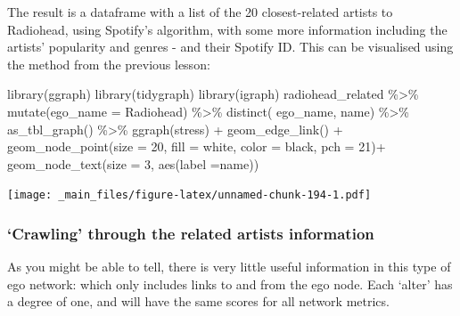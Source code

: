 \documentclass[
]{book}
\newenvironment{Shaded}{\begin{snugshade}}{\end{snugshade}}
\newcommand{\AttributeTok}[1]{\textcolor[rgb]{0.77,0.63,0.00}{#1}}
\newcommand{\DecValTok}[1]{\textcolor[rgb]{0.00,0.00,0.81}{#1}}
\newcommand{\FunctionTok}[1]{\textcolor[rgb]{0.00,0.00,0.00}{#1}}
\newcommand{\NormalTok}[1]{#1}
\newcommand{\SpecialCharTok}[1]{\textcolor[rgb]{0.00,0.00,0.00}{#1}}
\newcommand{\StringTok}[1]{\textcolor[rgb]{0.31,0.60,0.02}{#1}}
\begin{document}
The result is a dataframe with a list of the 20 closest-related artists to Radiohead, using Spotify's algorithm, with some more information including the artists' popularity and genres - and their Spotify ID. This can be visualised using the method from the previous lesson:

\begin{Shaded}
\begin{Highlighting}[]
\FunctionTok{library}\NormalTok{(ggraph)}
\FunctionTok{library}\NormalTok{(tidygraph)}
\FunctionTok{library}\NormalTok{(igraph)}
\NormalTok{radiohead\_related }\SpecialCharTok{\%\textgreater{}\%} 
  \FunctionTok{mutate}\NormalTok{(}\AttributeTok{ego\_name =} \StringTok{\textquotesingle{}Radiohead\textquotesingle{}}\NormalTok{) }\SpecialCharTok{\%\textgreater{}\%} 
  \FunctionTok{distinct}\NormalTok{( ego\_name, name) }\SpecialCharTok{\%\textgreater{}\%} 
  \FunctionTok{as\_tbl\_graph}\NormalTok{() }\SpecialCharTok{\%\textgreater{}\%} 
  \FunctionTok{ggraph}\NormalTok{(}\StringTok{\textquotesingle{}stress\textquotesingle{}}\NormalTok{) }\SpecialCharTok{+} \FunctionTok{geom\_edge\_link}\NormalTok{() }\SpecialCharTok{+} 
  \FunctionTok{geom\_node\_point}\NormalTok{(}\AttributeTok{size =} \DecValTok{20}\NormalTok{, }\AttributeTok{fill =} \StringTok{\textquotesingle{}white\textquotesingle{}}\NormalTok{, }\AttributeTok{color =} \StringTok{\textquotesingle{}black\textquotesingle{}}\NormalTok{, }\AttributeTok{pch =} \DecValTok{21}\NormalTok{)}\SpecialCharTok{+} 
  \FunctionTok{geom\_node\_text}\NormalTok{(}\AttributeTok{size =} \DecValTok{3}\NormalTok{, }\FunctionTok{aes}\NormalTok{(}\AttributeTok{label =}\NormalTok{name))}
\end{Highlighting}
\end{Shaded}

\texttt{[image: \_main\_files/figure-latex/unnamed-chunk-194-1.pdf]}

\hypertarget{crawling-through-the-related-artists-information}{%
\subsubsection{`Crawling' through the related artists information}\label{crawling-through-the-related-artists-information}}

As you might be able to tell, there is very little useful information in this type of ego network: which only includes links to and from the ego node. Each `alter' has a degree of one, and will have the same scores for all network metrics.
\end{document}
